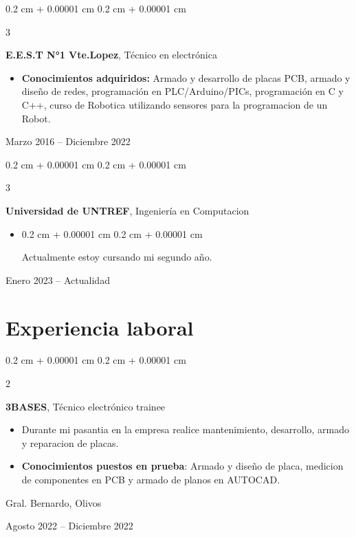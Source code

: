 \documentclass[10pt, letterpaper]{article}
\newenvironment{highlights}{
    \begin{itemize}[
        topsep=0.10 cm,
        parsep=0.10 cm,
        partopsep=0pt,
        itemsep=0pt,
        leftmargin=0.4 cm + 10pt
    ]
}{
    \end{itemize}
} %
\newenvironment{onecolentry}{
    \begin{adjustwidth}{
        0.2 cm + 0.00001 cm
    }{
        0.2 cm + 0.00001 cm
    }
}{
    \end{adjustwidth}
} %
\newenvironment{twocolentry}[2][]{
    \onecolentry
    \def\secondColumn{#2}
    \setcolumnwidth{\fill, 4.5 cm}
    \begin{paracol}{2}
}{
    \switchcolumn \raggedleft \secondColumn
    \end{paracol}
    \endonecolentry
} %
\newenvironment{threecolentry}[3][]{
    \onecolentry
    \def\thirdColumn{#3}
    \setcolumnwidth{1 cm, \fill, 4.5 cm}
    \begin{paracol}{3}
    {\raggedright #2} \switchcolumn
}{
    \switchcolumn \raggedleft \thirdColumn
    \end{paracol}
    \endonecolentry
} %
\begin{document}
        \begin{threecolentry}{\textbf{}}{
            Marzo 2016 – Diciembre 2022
        }
            \textbf{E.E.S.T N°1 Vte.Lopez}, Técnico en electrónica
            \begin{highlights}
                \item \textbf{Conocimientos adquiridos:} Armado y desarrollo de placas PCB, armado y diseño de redes, programación en PLC/Arduino/PICs, programación en C y C++, curso de Robotica utilizando sensores para la programacion de un Robot.
            \end{highlights}
        \end{threecolentry}

        \begin{threecolentry}{\textbf{}}{
            Enero 2023 – Actualidad
        }
            \textbf{Universidad de UNTREF}, Ingeniería en Computacion
            \begin{highlights}
                \item \begin{onecolentry}
                    Actualmente estoy cursando mi segundo año.
                \end{onecolentry}
            \end{highlights}
        \end{threecolentry}
    
    \section{Experiencia laboral}
      
        \begin{twocolentry}{
            Gral. Bernardo, Olivos

        Agosto 2022 – Diciembre 2022
        }
            \textbf{3BASES}, Técnico electrónico trainee
            \begin{highlights}
                \item Durante mi pasantia en la empresa realice mantenimiento, desarrollo, armado y reparacion de placas.
                \item \textbf{Conocimientos puestos en prueba}: Armado y diseño de placa, medicion de componentes en PCB y armado de planos en AUTOCAD. 
            \end{highlights}
        \end{twocolentry}
\end{document}
